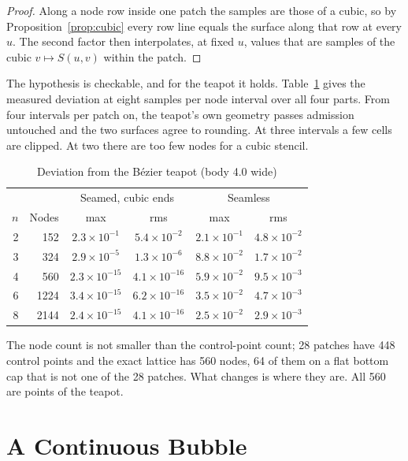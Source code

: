 \documentclass[journal]{IEEEtran}
\begin{document}
\begin{proof}
Along a node row inside one patch the samples are those of a cubic, so by
Proposition~\ref{prop:cubic} every row line equals the surface along that
row at every $u$. The second factor then interpolates, at fixed $u$,
values that are samples of the cubic $v\mapsto S(u,v)$ within the patch.
\end{proof}

The hypothesis is checkable, and for the teapot it holds.
Table~\ref{tab:exact} gives the measured deviation at eight samples per
node interval over all four parts. From four intervals per patch on, the
teapot's own geometry passes admission untouched and the two surfaces
agree to rounding. At three intervals a few cells are clipped. At two
there are too few nodes for a cubic stencil.

\begin{table}[H]
\caption{Deviation from the B\'ezier teapot (body 4.0 wide)}
\label{tab:exact}
\centering
\scriptsize
\begin{tabular}{rr|cc|cc}
\hline
 & & \multicolumn{2}{c|}{Seamed, cubic ends} & \multicolumn{2}{c}{Seamless}\\
$n$ & Nodes & max & rms & max & rms\\
\hline
2 & 152 & $2.3\times10^{-1}$ & $5.4\times10^{-2}$ & $2.1\times10^{-1}$ & $4.8\times10^{-2}$\\
3 & 324 & $2.9\times10^{-5}$ & $1.3\times10^{-6}$ & $8.8\times10^{-2}$ & $1.7\times10^{-2}$\\
4 & 560 & $2.3\times10^{-15}$ & $4.1\times10^{-16}$ & $5.9\times10^{-2}$ & $9.5\times10^{-3}$\\
6 & 1224 & $3.4\times10^{-15}$ & $6.2\times10^{-16}$ & $3.5\times10^{-2}$ & $4.7\times10^{-3}$\\
8 & 2144 & $2.4\times10^{-15}$ & $4.1\times10^{-16}$ & $2.5\times10^{-2}$ & $2.9\times10^{-3}$\\
\hline
\end{tabular}
\end{table}

The node count is not smaller than the control-point count; 28 patches
have 448 control points and the exact lattice has 560 nodes, 64 of them on
a flat bottom cap that is not one of the 28 patches. What changes is
where they are. All 560 are points of the teapot.

\section{A Continuous Bubble}
\label{sec:bubble}
\end{document}
